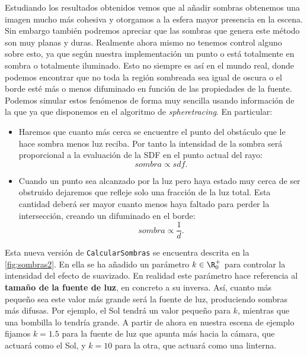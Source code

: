 Estudiando los resultados obtenidos vemos que al añadir sombras obtenemos una imagen mucho más cohesiva y otorgamos a la esfera mayor presencia en la escena. Sin embargo también podremos apreciar que las sombras que genera este método son muy planas y duras. Realmente ahora mismo no tenemos control alguno sobre esto, ya que según nuestra implementación un punto o está totalmente en sombra o totalmente iluminado. Esto no siempre es así en el mundo real, donde podemos encontrar que no toda la región sombreada sea igual de oscura o el borde esté más o menos difuminado en función de las propiedades de la fuente. Podemos simular estos fenómenos de forma muy sencilla usando información de la que ya que disponemos en el algoritmo de \textit{spheretracing}. En particular:
\begin{itemize}
    \item Haremos que cuanto más cerca se encuentre el punto del obstáculo que le hace sombra menos luz reciba. Por tanto la intensidad de la sombra será proporcional a la evaluación de la SDF en el punto actual del rayo:
    \begin{equation*}
        sombra \propto sdf.
    \end{equation*}
    \item Cuando un punto sea alcanzado por la luz pero haya estado muy cerca de ser obstruido dejaremos que refleje solo una fracción de la luz total. Esta cantidad deberá ser mayor cuanto menos haya faltado para perder la intersección, creando un difuminado en el borde:
    \begin{equation*}
        sombra \propto \frac{1}{d}.
    \end{equation*}
\end{itemize}

Esta nueva versión de \texttt{CalcularSombras} se encuentra descrita en la \autoref{fig:sombras2}. En ella se ha añadido un parámetro $k\in \R_0^+$ para controlar la intensidad del efecto de suavizado. En realidad este parámetro hace referencia al \textbf{tamaño de la fuente de luz}, en concreto a su inversa. Así, cuanto más pequeño sea este valor más grande será la fuente de luz, produciendo sombras más difusas. Por ejemplo, el Sol tendrá un valor pequeño para $k$, mientras que una bombilla lo tendría grande. A partir de ahora en nuestra escena de ejemplo fijamos $k=  1.5$ para la fuente de luz que apunta más hacia la cámara, que actuará como el Sol, y $k = 10$ para la otra, que actuará como una linterna.


